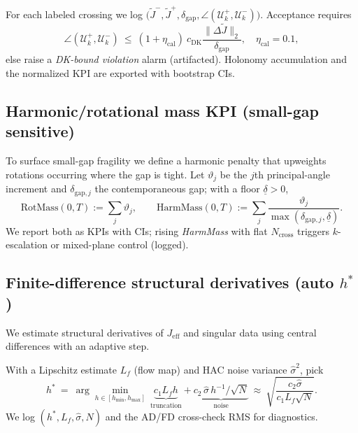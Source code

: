 \begin{proposition}\label{prop:dk-cal}
\emph{}
For each labeled crossing we log $\big(\widetilde J^{-},\widetilde J^{+},\delta_{\mathrm{gap}},\angle(\mathcal U_k^+,\mathcal U_k^-)\big)$.
Acceptance requires
\[
\angle(\mathcal U_k^+,\mathcal U_k^-)\ \le\ (1+\eta_{\mathrm{cal}})\ c_{\mathrm{DK}}\frac{\|\Delta \widetilde J\|_2}{\delta_{\mathrm{gap}}},\quad \eta_{\mathrm{cal}}=0.1,
\]
else raise a \emph{DK-bound violation} alarm (artifacted). Holonomy accumulation and the normalized KPI are exported with bootstrap CIs.
\end{proposition}

\subsection*{Harmonic/rotational mass KPI (small-gap sensitive)}
To surface small-gap fragility we define a harmonic penalty that upweights rotations occurring where the gap is tight.
Let $\vartheta_j$ be the $j$th principal-angle increment and $\delta_{\mathrm{gap},j}$ the contemporaneous gap; with a floor $\underline\delta>0$,
\[
\mathrm{RotMass}(0,T):=\sum_{j}\vartheta_j,
\qquad
\mathrm{HarmMass}(0,T):=\sum_{j}\frac{\vartheta_j}{\max(\delta_{\mathrm{gap},j},\underline\delta)}.
\]
We report both as KPIs with CIs; rising \emph{HarmMass} with flat $N_{\mathrm{cross}}$ triggers $k$-escalation or mixed-plane control (logged).

\subsection*{Finite-difference structural derivatives (auto $h^\ast$)}
We estimate structural derivatives of $J_{\mathrm{eff}}$ and singular data using central differences with an adaptive step.

\begin{definition}\label{def:hstar}
\emph{}
With a Lipschitz estimate $L_f$ (flow map) and HAC noise variance $\hat\sigma^2$, pick
\[
h^\ast \ =\ \arg\min_{h\in[h_{\min},h_{\max}]}\ \underbrace{c_1 L_f h}_{\text{truncation}} + \underbrace{c_2\, \hat\sigma\, h^{-1}/\sqrt{N}}_{\text{noise}}
\ \approx\
\sqrt{\frac{c_2\hat\sigma}{c_1 L_f \sqrt{N}}}.
\]
We log $(h^\ast,L_f,\hat\sigma,N)$ and the AD/FD cross-check RMS for diagnostics.
\end{definition}

